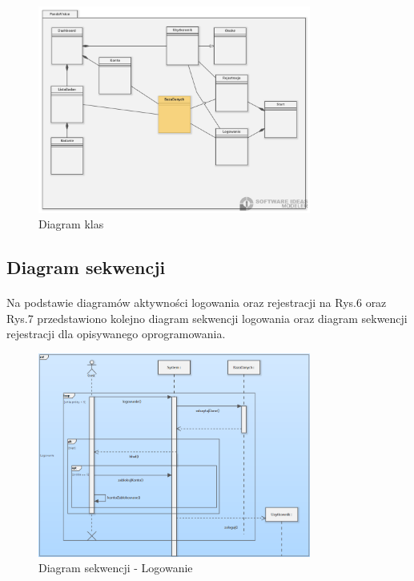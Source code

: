 \documentclass[12pt, letterpaper]{article}
\begin{document}
\begin{figure}[h]
  \centering
      \includegraphics[width=0.8\textwidth]{classDiagram}
  \caption{Diagram klas}
\end{figure}
		
\newpage		
\newpage
\subsection{Diagram sekwencji}
\paragraph{}
Na podstawie diagramów aktywności logowania oraz rejestracji na Rys.6 oraz Rys.7 przedstawiono kolejno diagram sekwencji logowania oraz diagram sekwencji rejestracji dla opisywanego oprogramowania.
		
\begin{figure}[h]
  \centering
      \includegraphics[width=0.8\textwidth]{seqDiagram}
  \caption{Diagram sekwencji - Logowanie}
\end{figure}
\end{document}
